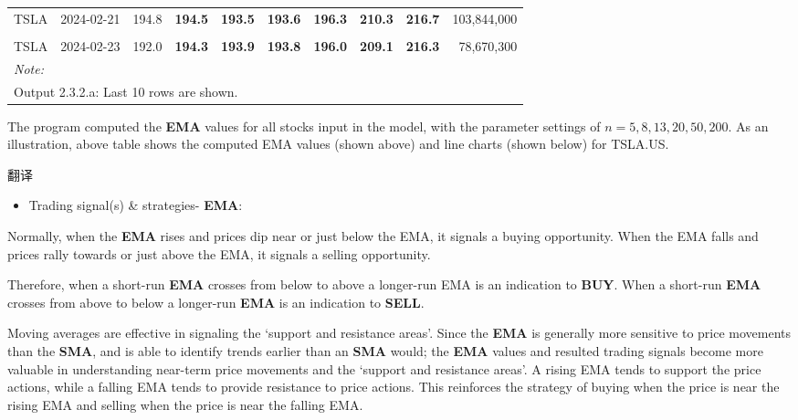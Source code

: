 \documentclass[
]{book}
\providecommand{\tightlist}{%
  \setlength{\itemsep}{0pt}\setlength{\parskip}{0pt}}
\begin{document}
\begin{table}[H]
{\begin{tabular}[t]{llr>{}r>{}r>{}r>{}r>{}r>{}rr}
TSLA & 2024-02-21 & 194.8 & \textbf{194.5} & \textbf{193.5} & \textbf{193.6} & \textbf{196.3} & \textbf{210.3} & \textbf{216.7} & 103,844,000\\
\cellcolor{gray!10}{TSLA} & \cellcolor{gray!10}{2024-02-22} & \cellcolor{gray!10}{197.4} & \textbf{\cellcolor{gray!10}{195.5}} & \textbf{\cellcolor{gray!10}{194.4}} & \textbf{\cellcolor{gray!10}{194.1}} & \textbf{\cellcolor{gray!10}{196.4}} & \textbf{\cellcolor{gray!10}{209.8}} & \textbf{\cellcolor{gray!10}{216.6}} & \cellcolor{gray!10}{92,739,500}\\
TSLA & 2024-02-23 & 192.0 & \textbf{194.3} & \textbf{193.9} & \textbf{193.8} & \textbf{196.0} & \textbf{209.1} & \textbf{216.3} & 78,670,300\\
\bottomrule
\multicolumn{10}{l}{\rule{0pt}{1em}\textit{Note: }}\\
\multicolumn{10}{l}{\rule{0pt}{1em}Output 2.3.2.a: Last 10 rows are shown.}\\
\end{tabular}}
\end{table}

The program computed the \textbf{EMA} values for all stocks input in the
model, with the parameter settings of \(n=5,8,13,20,50,200\). As an
illustration, above table shows the computed EMA values (shown above)
and line charts (shown below) for TSLA.US.

翻译

\begin{itemize}
\tightlist
\item
  Trading signal(s) \& strategies- \textbf{EMA}:
\end{itemize}

Normally, when the \textbf{EMA} rises and prices dip near or just below
the EMA, it signals a buying opportunity. When the EMA falls and prices
rally towards or just above the EMA, it signals a selling opportunity.

Therefore, when a short-run \textbf{EMA} crosses from below to above a
longer-run EMA is an indication to \textbf{BUY}. When a short-run
\textbf{EMA} crosses from above to below a longer-run \textbf{EMA} is an
indication to \textbf{SELL}.

Moving averages are effective in signaling the `support and resistance
areas'. Since the \textbf{EMA} is generally more sensitive to price
movements than the \textbf{SMA}, and is able to identify trends earlier
than an \textbf{SMA} would; the \textbf{EMA} values and resulted trading
signals become more valuable in understanding near-term price movements
and the `support and resistance areas'. A rising EMA tends to support
the price actions, while a falling EMA tends to provide resistance to
price actions. This reinforces the strategy of buying when the price is
near the rising EMA and selling when the price is near the falling EMA.
\end{document}
